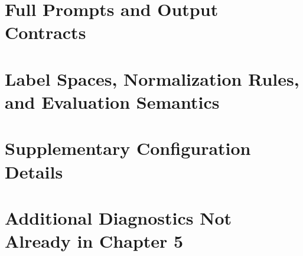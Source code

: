 %
%

\clearpage
{}
\printbibliography[title={Bibliography}]

\begin{appendices}

\chapter{Full Prompts and Output Contracts}
\label{app:prompts}
%
% 

\chapter{Label Spaces, Normalization Rules, and Evaluation Semantics}
\label{app:labels}
%
% 

\chapter{Supplementary Configuration Details}
\label{app:configs}
%
% 

\chapter{Additional Diagnostics Not Already in Chapter 5}
\label{app:results}
%
% 


\end{appendices}

